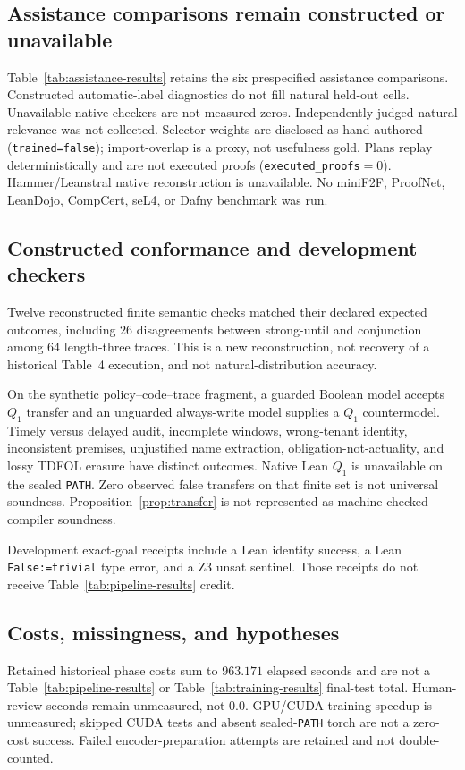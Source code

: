 \documentclass{article}
\begin{document}
\subsection{Assistance comparisons remain constructed or unavailable}
Table~\ref{tab:assistance-results} retains the six prespecified assistance comparisons. Constructed automatic-label diagnostics do not fill natural held-out cells. Unavailable native checkers are not measured zeros. Independently judged natural relevance was not collected. Selector weights are disclosed as hand-authored (\texttt{trained=false}); import-overlap is a proxy, not usefulness gold. Plans replay deterministically and are not executed proofs (\texttt{executed\_proofs}$=0$). Hammer/Leanstral native reconstruction is unavailable. No miniF2F, ProofNet, LeanDojo, CompCert, seL4, or Dafny benchmark was run.



\subsection{Constructed conformance and development checkers}
Twelve reconstructed finite semantic checks matched their declared expected outcomes, including $26$ disagreements between strong-until and conjunction among $64$ length-three traces. This is a new reconstruction, not recovery of a historical Table~4 execution, and not natural-distribution accuracy.

On the synthetic policy--code--trace fragment, a guarded Boolean model accepts $Q_1$ transfer and an unguarded always-write model supplies a $Q_1$ countermodel. Timely versus delayed audit, incomplete windows, wrong-tenant identity, inconsistent premises, unjustified name extraction, obligation-not-actuality, and lossy TDFOL erasure have distinct outcomes. Native Lean $Q_1$ is unavailable on the sealed \texttt{PATH}. Zero observed false transfers on that finite set is not universal soundness. Proposition~\ref{prop:transfer} is not represented as machine-checked compiler soundness.

Development exact-goal receipts include a Lean identity success, a Lean \texttt{False:=trivial} type error, and a Z3 unsat sentinel. Those receipts do not receive Table~\ref{tab:pipeline-results} credit.

\subsection{Costs, missingness, and hypotheses}
Retained historical phase costs sum to $963.171$ elapsed seconds and are not a Table~\ref{tab:pipeline-results} or Table~\ref{tab:training-results} final-test total. Human-review seconds remain unmeasured, not $0.0$. GPU/CUDA training speedup is unmeasured; skipped CUDA tests and absent sealed-\texttt{PATH} torch are not a zero-cost success. Failed encoder-preparation attempts are retained and not double-counted.
\end{document}

